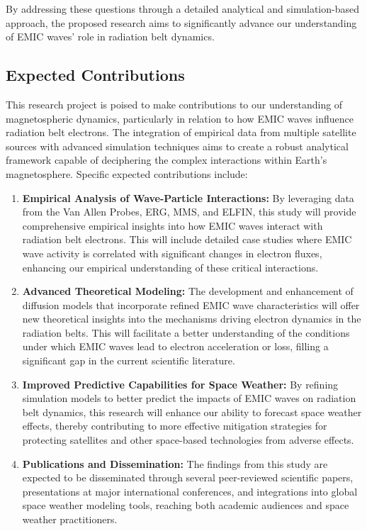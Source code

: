 \documentclass[
  letterpaper,
  DIV=11,
  numbers=noendperiod]{scrartcl}
\begin{document}
By addressing these questions through a detailed analytical and simulation-based approach, the proposed research aims to significantly advance our understanding of EMIC waves' role in radiation belt dynamics.

\subsection{Expected Contributions}\label{expected-contributions}

This research project is poised to make contributions to our understanding of magnetospheric dynamics, particularly in relation to how EMIC waves influence radiation belt electrons. The integration of empirical data from multiple satellite sources with advanced simulation techniques aims to create a robust analytical framework capable of deciphering the complex interactions within Earth's magnetosphere. Specific expected contributions include:

\begin{enumerate}
\def\labelenumi{\arabic{enumi}.}
\item
  \textbf{Empirical Analysis of Wave-Particle Interactions:} By leveraging data from the Van Allen Probes, ERG, MMS, and ELFIN, this study will provide comprehensive empirical insights into how EMIC waves interact with radiation belt electrons. This will include detailed case studies where EMIC wave activity is correlated with significant changes in electron fluxes, enhancing our empirical understanding of these critical interactions.
\item
  \textbf{Advanced Theoretical Modeling:} The development and enhancement of diffusion models that incorporate refined EMIC wave characteristics will offer new theoretical insights into the mechanisms driving electron dynamics in the radiation belts. This will facilitate a better understanding of the conditions under which EMIC waves lead to electron acceleration or loss, filling a significant gap in the current scientific literature.
\item
  \textbf{Improved Predictive Capabilities for Space Weather:} By refining simulation models to better predict the impacts of EMIC waves on radiation belt dynamics, this research will enhance our ability to forecast space weather effects, thereby contributing to more effective mitigation strategies for protecting satellites and other space-based technologies from adverse effects.
\item
  \textbf{Publications and Dissemination:} The findings from this study are expected to be disseminated through several peer-reviewed scientific papers, presentations at major international conferences, and integrations into global space weather modeling tools, reaching both academic audiences and space weather practitioners.
\end{enumerate}
\end{document}
